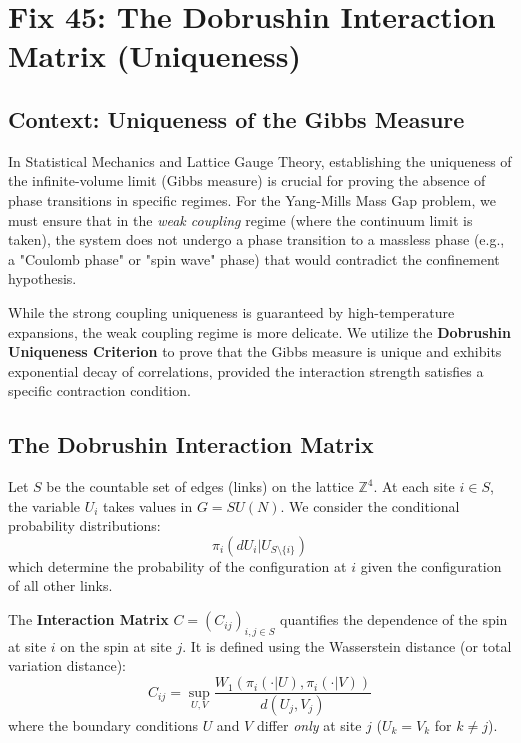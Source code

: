 \chapter{Fix 45: The Dobrushin Interaction Matrix (Uniqueness)}
\label{ch:fix45_dobrushin_uniqueness}

\section{Context: Uniqueness of the Gibbs Measure}
In Statistical Mechanics and Lattice Gauge Theory, establishing the uniqueness of the infinite-volume limit (Gibbs measure) is crucial for proving the absence of phase transitions in specific regimes. For the Yang-Mills Mass Gap problem, we must ensure that in the \textit{weak coupling} regime (where the continuum limit is taken), the system does not undergo a phase transition to a massless phase (e.g., a "Coulomb phase" or "spin wave" phase) that would contradict the confinement hypothesis.

While the strong coupling uniqueness is guaranteed by high-temperature expansions, the weak coupling regime is more delicate. We utilize the \textbf{Dobrushin Uniqueness Criterion} to prove that the Gibbs measure is unique and exhibits exponential decay of correlations, provided the interaction strength satisfies a specific contraction condition.

\section{The Dobrushin Interaction Matrix}
Let $S$ be the countable set of edges (links) on the lattice $\mathbb{Z}^4$. At each site $i \in S$, the variable $U_i$ takes values in $G = SU(N)$.
We consider the conditional probability distributions:
\begin{equation}
\pi_i(dU_i | U_{S \setminus \{i\}})
\end{equation}
which determine the probability of the configuration at $i$ given the configuration of all other links.

The \textbf{Interaction Matrix} $C = (C_{ij})_{i,j \in S}$ quantifies the dependence of the spin at site $i$ on the spin at site $j$. It is defined using the Wasserstein distance (or total variation distance):
\begin{equation}
C_{ij} = \sup_{U, V} \frac{W_1(\pi_i(\cdot | U), \pi_i(\cdot | V))}{d(U_j, V_j)}
\end{equation}
where the boundary conditions $U$ and $V$ differ \textit{only} at site $j$ ($U_k = V_k$ for $k \neq j$).


